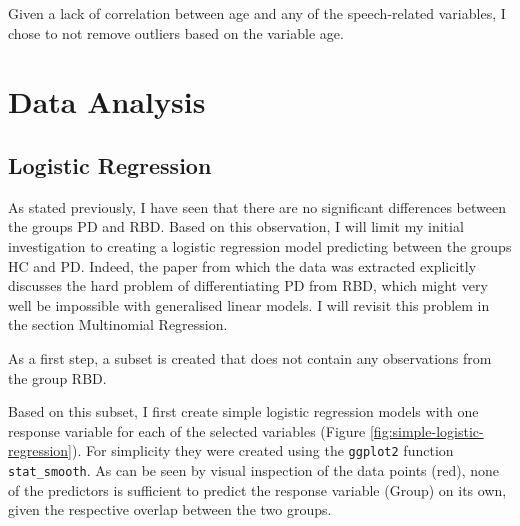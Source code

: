 \documentclass[
  english,
  doc,floatsintext]{apa6}
\newenvironment{Shaded}{\begin{snugshade}}{\end{snugshade}}
\newcommand{\FunctionTok}[1]{\textcolor[rgb]{0.00,0.00,0.00}{#1}}
\newcommand{\NormalTok}[1]{#1}
\newcommand{\OtherTok}[1]{\textcolor[rgb]{0.56,0.35,0.01}{#1}}
\newcommand{\SpecialCharTok}[1]{\textcolor[rgb]{0.00,0.00,0.00}{#1}}
\newcommand{\StringTok}[1]{\textcolor[rgb]{0.31,0.60,0.02}{#1}}
\begin{document}
Given a lack of correlation between age and any of the speech-related variables, I chose to not remove
outliers based on the variable age.

\clearpage

\hypertarget{data-analysis}{%
\section{Data Analysis}\label{data-analysis}}

\hypertarget{logistic-regression}{%
\subsection{Logistic Regression}\label{logistic-regression}}

As stated previously, I have seen that there are no significant differences between the groups PD and RBD.
Based on this observation, I will limit my initial investigation to creating a logistic regression model predicting
between the groups HC and PD. Indeed, the paper from which the data was extracted explicitly
discusses the hard problem of differentiating PD from RBD, which might very well be impossible with
generalised linear models. I will revisit this problem in the section Multinomial Regression.

As a first step, a subset is created that does not contain any observations from the group RBD.

\begin{Shaded}
\end{Shaded}

Based on this subset, I first create simple logistic regression models with one response variable
for each of the selected variables (Figure \ref{fig:simple-logistic-regression}). For simplicity
they were created using the \texttt{ggplot2} function \texttt{stat\_smooth}. As can be seen by visual inspection
of the data points (red), none of the predictors is sufficient to predict the response variable
(Group) on its own, given the respective overlap between the two groups.
\end{document}
